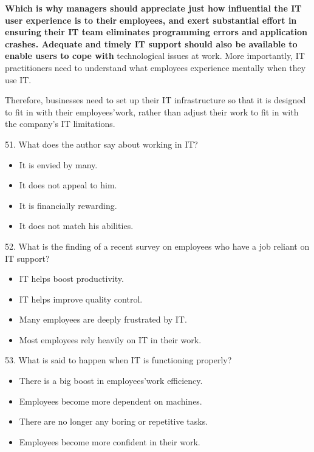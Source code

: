 \documentclass[UTF8,11pt]{ctexart}
\begin{document}
\textbf{Which is why managers should appreciate just how influential the IT user experience is to their} \textbf{employees, and exert substantial effort in ensuring their IT team eliminates programming errors and} \textbf{application crashes. Adequate and timely IT support should also be available to enable users to cope with} technological issues at work. More importantly, IT practitioners need to understand what employees experience mentally when they use IT.


Therefore, businesses need to set up their IT infrastructure so that it is designed to fit in with their employees'work, rather than adjust their work to fit in with the company's IT limitations.


51. What does the author say about working in IT?


\begin{itemize}[leftmargin=2em,itemsep=.2em,topsep=.4em]\item[A.] It is envied by many.
\item[B.] It does not appeal to him.
\item[C.] It is financially rewarding.
\item[D.] It does not match his abilities.
\end{itemize}

52. What is the finding of a recent survey on employees who have a job reliant on IT support?


\begin{itemize}[leftmargin=2em,itemsep=.2em,topsep=.4em]\item[A.] IT helps boost productivity.
\item[B.] IT helps improve quality control.
\item[C.] Many employees are deeply frustrated by IT.
\item[D.] Most employees rely heavily on IT in their work.
\end{itemize}

53. What is said to happen when IT is functioning properly?


\begin{itemize}[leftmargin=2em,itemsep=.2em,topsep=.4em]\item[A.] There is a big boost in employees'work efficiency.
\item[B.] Employees become more dependent on machines.
\item[C.] There are no longer any boring or repetitive tasks.
\item[D.] Employees become more confident in their work.
\end{itemize}
\end{document}

